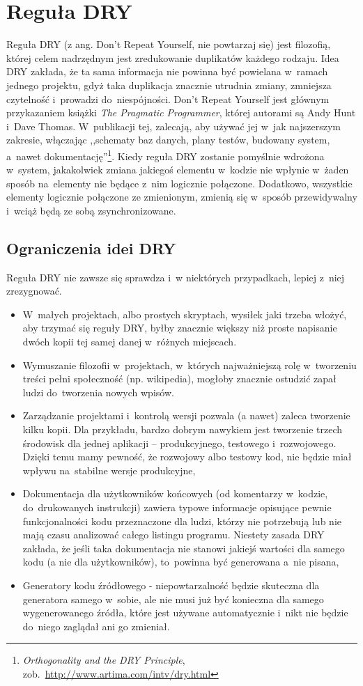 \documentclass[a4paper,12pt,oneside]{report}
\begin{document}
\section{Reguła DRY}
\label{sec:dry}
Reguła DRY (z ang. Don't Repeat Yourself, nie powtarzaj się) jest filozofią, której celem nadrzędnym jest zredukowanie duplikatów każdego rodzaju. Idea DRY zakłada, że ta sama informacja nie powinna być powielana w~ramach jednego projektu, gdyż taka duplikacja znacznie utrudnia zmiany, zmniejsza czytelność i~prowadzi do~niespójności. Don't Repeat Yourself jest głównym przykazaniem książki \emph{The Pragmatic Programmer}\cite{pragmatic}, której autorami są Andy Hunt i~Dave Thomas. W~publikacji tej, zalecają, aby używać jej w~jak najszerszym zakresie, włączając ,,schematy baz danych, plany testów, budowany system, a~nawet dokumentację''\footnote{\emph{Orthogonality and the DRY Principle}, zob.~\url{http://www.artima.com/intv/dry.html}}. Kiedy reguła DRY zostanie pomyślnie wdrożona w~system, jakakolwiek zmiana jakiegoś elementu w~kodzie nie wpłynie w~żaden sposób na~elementy nie będące z~nim logicznie połączone. Dodatkowo, wszystkie elementy logicznie połączone ze zmienionym, zmienią się w~sposób przewidywalny i~wciąż będą ze sobą zsynchronizowane.

\subsection{Ograniczenia idei DRY}
\label{sub:dry-not}
Reguła DRY nie zawsze się sprawdza i~w niektórych przypadkach, lepiej z~niej zrezygnować.
\begin{itemize}
  \item W~małych projektach, albo prostych skryptach, wysiłek jaki trzeba włożyć, aby trzymać się reguły DRY, byłby znacznie większy niż proste napisanie dwóch kopii tej samej danej w~różnych miejscach.
  \item Wymuszanie filozofii w~projektach, w~których najważniejszą rolę w~tworzeniu treści pełni społeczność (np. wikipedia), mogłoby znacznie ostudzić zapał ludzi do~tworzenia nowych wpisów.
  \item Zarządzanie projektami i~kontrolą wersji pozwala (a nawet) zaleca tworzenie kilku kopii. Dla przykładu, bardzo dobrym nawykiem jest tworzenie trzech środowisk dla jednej aplikacji -- produkcyjnego, testowego i~rozwojowego. Dzięki temu mamy pewność, że rozwojowy albo testowy kod, nie będzie miał wpływu na~stabilne wersje produkcyjne,
  \item Dokumentacja dla użytkowników końcowych (od komentarzy w~kodzie, do~drukowanych instrukcji) zawiera typowe informacje opisujące pewnie funkcjonalności kodu przeznaczone dla ludzi, którzy nie potrzebują lub nie mają czasu analizować całego listingu programu. Niestety zasada DRY zakłada, że jeśli taka dokumentacja nie stanowi jakiejś wartości dla samego kodu (a nie dla użytkowników), to~powinna być generowana a~nie pisana,
  \item Generatory kodu źródłowego - niepowtarzalność będzie skuteczna dla generatora samego w~sobie, ale nie musi już być konieczna dla samego wygenerowanego źródła, które jest używane automatycznie i~nikt nie będzie do~niego zaglądał ani go zmieniał.
\end{itemize}
\end{document}
